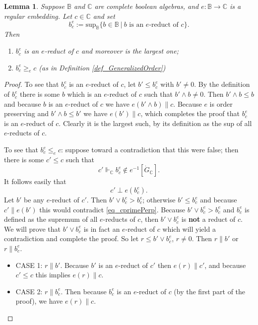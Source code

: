 \documentclass{amsart}
\newtheorem{lemma}[theorem]{Lemma}
\begin{document}
\begin{lemma}\label{lem_GeneralizedNiceReduct}
Suppose $\mathbb{B}$ and $\mathbb{C}$ are complete boolean algebras, and $e: \mathbb{B} \to \mathbb{C}$ is a regular embedding.  Let $c \in \mathbb{C}$ and set
\begin{equation*}
b^e_c:= \text{sup}_{\mathbb{B}} \{ b \in \mathbb{B} \ | \ b \text{ is an } e \text{-reduct of } c   \} .
\end{equation*}
Then
\begin{enumerate}
 \item $b^e_c$ is an $e$-reduct of $c$ and moreover is the largest one;
 \item $b^e_c \ge_e c$ (as in Definition \ref{def_GeneralizedOrder})
\end{enumerate}  
\end{lemma}
\begin{proof}
To see that $b^e_c$ is an $e$-reduct of $c$, let $b' \le b^e_c$ with $b' \ne 0$.  By the definition of $b^e_c$ there is some $b$ which is an $e$-reduct of $c$ such that $b' \wedge b \ne 0$.  Then $b' \wedge b \le b$ and because $b$ is an $e$-reduct of $c$ we have $e(b' \wedge b) \parallel c$.  Because $e$ is order preserving and $b' \wedge b \le b'$ we have $e(b') \parallel c$, which completes the proof that $b^e_c$ is an $e$-reduct of $c$.  Clearly it is the largest such, by its definition as the sup of all $e$-reducts of $c$.

To see that $b^e_c \le_e c$: suppose toward a contradiction that this were false; then there is some $c' \le c$ such that
\begin{equation*}
c' \Vdash_{\mathbb{C}} b^e_c \notin e^{-1}[\dot{G}_{\mathbb{C}}] .
\end{equation*}
It follows easily that
\begin{equation}\label{eq_cprimePerp}
c' \perp e(b^e_c).
\end{equation}
Let $b'$ be any $e$-reduct of $c'$.  Then $b' \vee b^e_c > b^e_c$; otherwise $b' \le b^e_c$ and because $c' \parallel e(b')$ this would contradict \eqref{eq_cprimePerp}.  Because $b' \vee b^e_c > b^e_c$ and $b^e_c$ is defined as the supremum of all $e$-reducts of $c$, then $b' \vee b^e_c$ is \textbf{not} a reduct of $c$.  We will prove that $b' \vee b^e_c$ is in fact an $e$-reduct of $c$ which will yield a contradiction and complete the proof.  So let $r \le b' \vee b^e_c$, $r \ne 0$.  Then $r \parallel b'$ or $r \parallel b^e_c$.  
\begin{itemize}
 \item CASE 1:  $r \parallel b'$.  Because $b'$ is an $e$-reduct of $c'$ then $e(r) \parallel c'$, and because $c' \le c$ this implies $e(r) \parallel c$.
 \item CASE 2:  $r \parallel b^e_c$.  Then because  $b^e_c$ is an $e$-reduct of $c$ (by the first part of the proof), we have $e(r) \parallel c$.
\end{itemize}
\end{proof}
\end{document}
